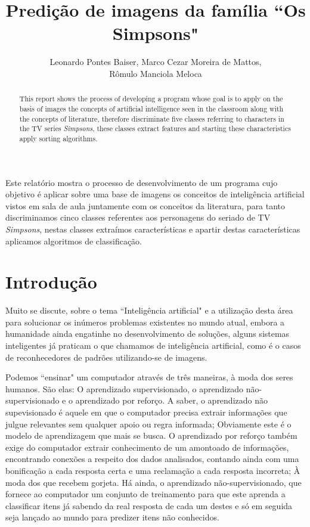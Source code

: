 \documentclass[12pt]{article}
\title{Predição de imagens da família ``Os Simpsons"}
\author{Leonardo Pontes Baiser\inst{1}, Marco Cezar Moreira de Mattos\inst{1},\\
		Rômulo Manciola Meloca\inst{1}}
\begin{document}
	
\maketitle

\begin{abstract}

	This report shows the process of developing a program whose goal is to apply on the basis of images the concepts of artificial intelligence seen in the classroom along with the concepts of literature, therefore discriminate five classes referring to characters in the TV series \textit{Simpsons}, these classes extract features and starting these characteristics apply sorting algorithms.

\end{abstract}
     
\begin{resumo} 
  Este relatório mostra o processo de desenvolvimento de um programa cujo objetivo é aplicar sobre uma base de imagens os conceitos de inteligência artificial vistos em sala de aula juntamente com os conceitos da literatura, para tanto discriminamos cinco classes referentes aos personagens do seriado de TV \textit{Simpsons}, nestas classes extraímos características e apartir destas características aplicamos algoritmos de classificação.	
\end{resumo}

\section{Introdução}\label{sec:introducao}

	Muito se discute, sobre o tema ``Inteligência artificial" e a utilização desta área para solucionar os inúmeros problemas existentes no mundo atual, embora a humanidade ainda engatinhe no desenvolvimento de soluções, alguns sistemas inteligentes já praticam o que chamamos de inteligência artificial, como é o casos de reconhecedores de padrões utilizando-se de imagens.

	Podemos ``ensinar" um computador através de três maneiras, à moda dos seres humanos. São elas: O aprendizado supervisionado, o aprendizado não-supervisionado e o aprendizado por reforço. A saber, o aprendizado não supevisionado é aquele em que o computador precisa extrair informações que julgue relevantes sem qualquer apoio ou regra informada; Obviamente este é o modelo de aprendizagem que mais se busca. O aprendizado por reforço também exige do computador extrair conhecimento de um amontoado de informações, encontrando conexões a respeito dos dados analisados, contando ainda com uma bonificação a cada resposta certa e uma reclamação a cada resposta incorreta; À moda dos que recebem gorjeta. Há ainda, o aprendizado não-supervisionado, que fornece ao computador um conjunto de treinamento para que este aprenda a classificar itens já sabendo da real resposta de cada um destes e só em seguida seja lançado ao mundo para predizer itens não conhecidos.
\end{document}
